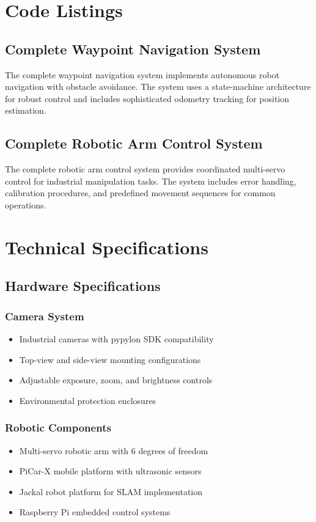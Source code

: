 \documentclass{book}
\begin{document}
\begin{appendices}
\chapter{Code Listings}

\section{Complete Waypoint Navigation System}
\par\noindent The complete waypoint navigation system implements autonomous robot navigation with obstacle avoidance. The system uses a state-machine architecture for robust control and includes sophisticated odometry tracking for position estimation.

\section{Complete Robotic Arm Control System}
\par\noindent The complete robotic arm control system provides coordinated multi-servo control for industrial manipulation tasks. The system includes error handling, calibration procedures, and predefined movement sequences for common operations.

\chapter{Technical Specifications}

\section{Hardware Specifications}

\subsection{Camera System}
\begin{itemize}
\item Industrial cameras with pypylon SDK compatibility
\item Top-view and side-view mounting configurations
\item Adjustable exposure, zoom, and brightness controls
\item Environmental protection enclosures
\end{itemize}

\subsection{Robotic Components}
\begin{itemize}
\item Multi-servo robotic arm with 6 degrees of freedom
\item PiCar-X mobile platform with ultrasonic sensors
\item Jackal robot platform for SLAM implementation
\item Raspberry Pi embedded control systems
\end{itemize}


\end{appendices}
\end{document}
